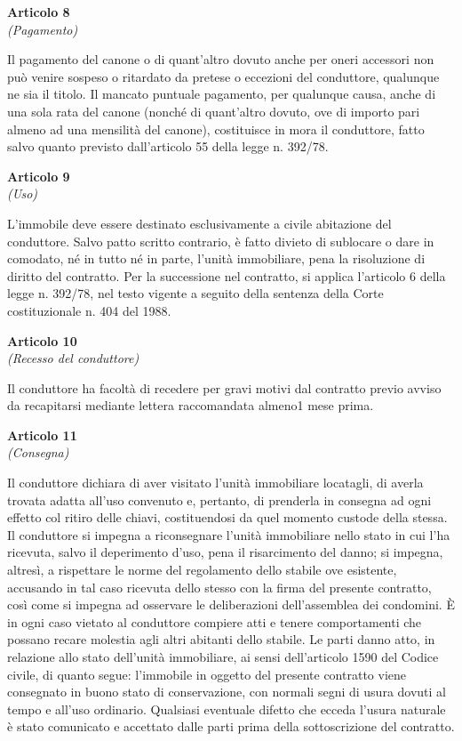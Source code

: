 \documentclass{contratto}
\begin{document}
\begin{center}
\textbf{\Large Articolo 8}\\
\textit{(Pagamento)}
\end{center}
 Il pagamento del canone o di quant'altro dovuto anche per oneri accessori non può venire sospeso o ritardato da pretese o eccezioni del conduttore, qualunque
ne sia il titolo. Il mancato puntuale pagamento, per qualunque causa, anche di una sola rata del canone (nonché di quant'altro dovuto, ove di importo pari almeno ad una mensilità del canone), costituisce in mora il conduttore, fatto salvo quanto previsto dall’articolo 55 della legge n. 392/78.

\begin{center}
\textbf{\Large Articolo 9}\\
\textit{(Uso)}
\end{center}
 L'immobile deve essere destinato esclusivamente a civile abitazione del conduttore. Salvo patto scritto contrario, è fatto divieto di sublocare o dare in comodato, né in tutto né in parte, l’unità immobiliare, pena la risoluzione di diritto del contratto. Per la successione nel contratto, si applica l'articolo 6 della legge n. 392/78, nel testo vigente a seguito della sentenza della Corte costituzionale n. 404 del 1988.

\newpage
\begin{center}
\textbf{\Large Articolo 10}\\
\textit{(Recesso del conduttore)}
\end{center}
Il conduttore ha facoltà di recedere per gravi motivi dal contratto previo avviso da recapitarsi mediante lettera raccomandata almeno1 mese prima.

\begin{center}
\textbf{\Large Articolo 11}\\
\textit{(Consegna)}
\end{center}
 Il conduttore dichiara di aver visitato l'unità immobiliare locatagli, di averla trovata adatta all'uso convenuto e, pertanto, di prenderla in consegna ad ogni effetto col
ritiro delle chiavi, costituendosi da quel momento custode della stessa. Il conduttore si impegna a riconsegnare l'unità immobiliare nello stato in cui l'ha ricevuta, salvo il
deperimento d'uso, pena il risarcimento del danno; si impegna, altresì, a rispettare le norme del regolamento dello stabile ove esistente, accusando in tal caso ricevuta dello stesso con la firma del presente contratto, così come si impegna ad osservare le deliberazioni dell'assemblea dei condomini. È in ogni caso vietato al conduttore compiere atti e tenere comportamenti che possano recare molestia agli altri abitanti dello stabile. Le parti danno atto, in relazione allo stato dell’unità immobiliare, ai sensi dell'articolo 1590 del Codice civile, di quanto segue: l'immobile in oggetto del presente contratto viene consegnato in buono stato di conservazione, con normali segni di usura dovuti al tempo e all'uso ordinario. Qualsiasi eventuale difetto che ecceda l'usura naturale è stato comunicato e accettato dalle parti prima della sottoscrizione del contratto.
\end{document}
